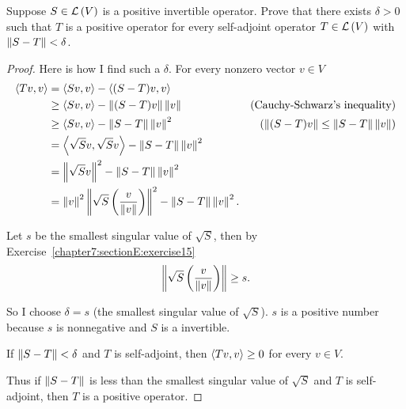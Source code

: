 \begin{exercise}
    Suppose $S\in\mathcal{L}\left({V}\right)$ is a positive invertible operator. Prove that there exists $\delta > 0$ such that $T$ is a positive operator for every self-adjoint operator $T\in \mathcal{L}\left({V}\right)$ with $\left\Vert{S - T}\right\Vert < \delta$.
\end{exercise}

\begin{proof}
    Here is how I find such a $\delta$. For every nonzero vector $v\in V$
    \begin{align*}
        \left\langle{Tv, v}\right\rangle & = \left\langle{Sv, v}\right\rangle - \left\langle{(S - T)v, v}\right\rangle                                                                                             \\
                          & \geq \left\langle{Sv, v}\right\rangle - \left\Vert{(S - T)v}\right\Vert\left\Vert{v}\right\Vert                                             & \text{(Cauchy-Schwarz's inequality)}       \\
                          & \geq \left\langle{Sv, v}\right\rangle - \left\Vert{S - T}\right\Vert\left\Vert{v}\right\Vert^{2}                                            & (\left\Vert{(S - T)v}\right\Vert\leq \left\Vert{S - T}\right\Vert\left\Vert{v}\right\Vert) \\
                          & = \left\langle{\sqrt{S}v, \sqrt{S}v}\right\rangle - \left\Vert{S - T}\right\Vert\left\Vert{v}\right\Vert^{2}                                                                             \\
                          & = \left\Vert{\sqrt{S}v}\right\Vert^{2} - \left\Vert{S - T}\right\Vert\left\Vert{v}\right\Vert^{2}                                                                                         \\
                          & = \left\Vert{v}\right\Vert^{2}\left\Vert{\sqrt{S}\left(\frac{v}{\left\Vert{v}\right\Vert}\right)}\right\Vert^{2} - \left\Vert{S - T}\right\Vert\left\Vert{v}\right\Vert^{2}.
    \end{align*}

    Let $s$ be the smallest singular value of $\sqrt{S}$, then by Exercise~\ref{chapter7:sectionE:exercise15}
    \[
        \left\Vert{\sqrt{S}\left(\frac{v}{\left\Vert{v}\right\Vert}\right)}\right\Vert \geq s.
    \]

    So I choose $\delta = s$ (the smallest singular value of $\sqrt{S}$). $s$ is a positive number because $s$ is nonnegative and $S$ is a invertible.

    If $\left\Vert{S - T}\right\Vert < \delta$ and $T$ is self-adjoint, then $\left\langle{Tv, v}\right\rangle\geq 0$ for every $v\in V$.

    Thus if $\left\Vert{S - T}\right\Vert$ is less than the smallest singular value of $\sqrt{S}$ and $T$ is self-adjoint, then $T$ is a positive operator.
\end{proof}
\newpage

